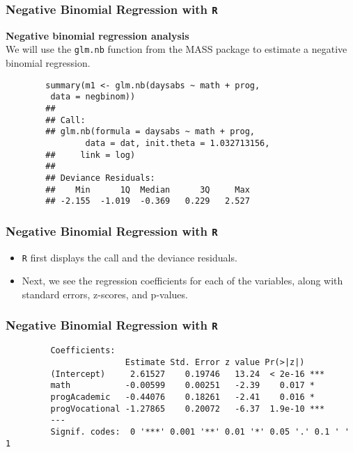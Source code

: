 \documentclass[MASTER.tex]{subfiles}
\begin{document}
\begin{frame}[fragile]
	\frametitle{Negative Binomial Regression with \texttt{R} }
	\large
	
\textbf{Negative binomial regression analysis}\\
	We will use the \texttt{glm.nb} function from the MASS package to estimate a negative binomial regression.
	\begin{verbatim}
		summary(m1 <- glm.nb(daysabs ~ math + prog, 
		 data = negbinom))
		## 
		## Call:
		## glm.nb(formula = daysabs ~ math + prog, 
		        data = dat, init.theta = 1.032713156, 
		##     link = log)
		## 
		## Deviance Residuals: 
		##    Min      1Q  Median      3Q     Max  
		## -2.155  -1.019  -0.369   0.229   2.527  
			\end{verbatim}
	\end{frame}
\begin{frame}[fragile]
	\frametitle{Negative Binomial Regression with \texttt{R} }
	\Large
	\begin{itemize}
		\item \texttt{R} first displays the call and the deviance residuals. 
		\item Next, we see the regression coefficients for each of the variables, along with standard errors, z-scores, 
		and p-values. 
	\end{itemize}
\end{frame}
	\begin{frame}[fragile]
		\frametitle{Negative Binomial Regression with \texttt{R} }

		\begin{verbatim} 
		 Coefficients:
		                Estimate Std. Error z value Pr(>|z|)    
		 (Intercept)     2.61527    0.19746   13.24  < 2e-16 ***
		 math           -0.00599    0.00251   -2.39    0.017 *  
		 progAcademic   -0.44076    0.18261   -2.41    0.016 *  
		 progVocational -1.27865    0.20072   -6.37  1.9e-10 ***
		 ---
		 Signif. codes:  0 '***' 0.001 '**' 0.01 '*' 0.05 '.' 0.1 ' ' 1

		\end{verbatim}

	
\end{frame}
\end{document}
